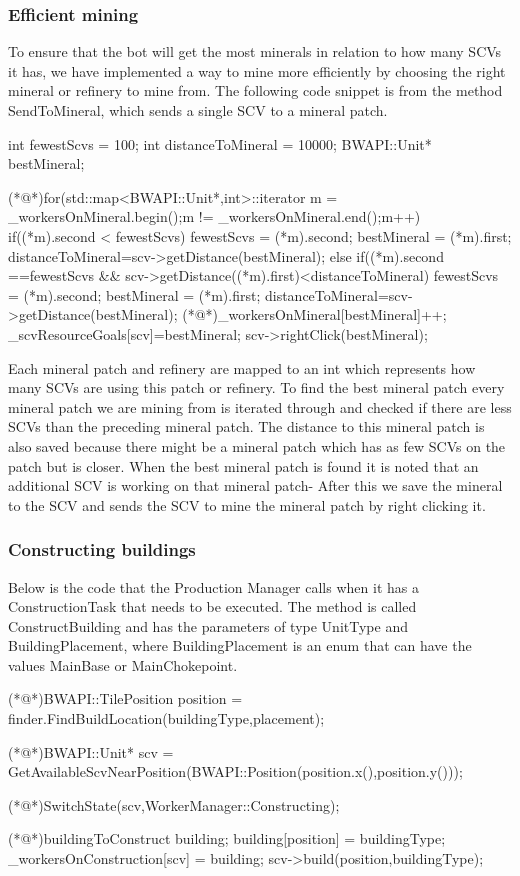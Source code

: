 		\subsubsection*{Efficient mining}
			To ensure that the bot will get the most minerals in relation to how many SCVs it has, we have implemented a way to mine more efficiently by choosing the right mineral or refinery to mine from. The following code snippet is from the method SendToMineral, which sends a single SCV
			to a mineral patch.
			
				\begin{Sourcecode}[caption=SendToMineral method]
	int fewestScvs = 100;
	int distanceToMineral = 10000;
	BWAPI::Unit* bestMineral;

	(*@\lnote@*)for(std::map<BWAPI::Unit*,int>::iterator m = _workersOnMineral.begin();m != _workersOnMineral.end();m++)
	{
		if((*m).second < fewestScvs)
		{
			fewestScvs = (*m).second;
			bestMineral = (*m).first;
			distanceToMineral=scv->getDistance(bestMineral);
		}
		else if((*m).second ==fewestScvs && scv->getDistance((*m).first)<distanceToMineral)
		{
			fewestScvs = (*m).second;
			bestMineral = (*m).first;
			distanceToMineral=scv->getDistance(bestMineral);
		}
	}
	(*@\lnote@*)_workersOnMineral[bestMineral]++;
	_scvResourceGoals[scv]=bestMineral;
	scv->rightClick(bestMineral);
				\end{Sourcecode}
			Each mineral patch and refinery are mapped to an int which represents how many SCVs are using this patch or refinery. To find the best mineral 
			patch every mineral patch we are mining from is iterated through  and checked if there are less SCVs than the preceding mineral patch. 
			The distance to this mineral patch is also saved because there might be a mineral patch which has as few SCVs on the patch but is closer. 
			When the best mineral patch is found it is noted that an additional SCV is working on that mineral patch- After this we save the 
			mineral to the SCV and sends the SCV to mine the mineral patch by right clicking it.
			
		\subsubsection*{Constructing buildings}
			Below is the code that the Production Manager calls when it has a ConstructionTask that needs to be executed. The method is called 
			ConstructBuilding and has the parameters of type UnitType and BuildingPlacement, where BuildingPlacement 
			is an enum that can have the values MainBase or MainChokepoint.
			\pagebreak
			\begin{Sourcecode}[caption=ConstructBuilding method]		
	(*@\lnote@*)BWAPI::TilePosition position = finder.FindBuildLocation(buildingType,placement);

	(*@\lnote@*)BWAPI::Unit* scv = GetAvailableScvNearPosition(BWAPI::Position(position.x(),position.y()));
	

	(*@\lnote@*)SwitchState(scv,WorkerManager::Constructing);
	
	(*@\lnote@*)buildingToConstruct building;	
	building[position] = buildingType;
	_workersOnConstruction[scv] = building;
	scv->build(position,buildingType);
			\end{Sourcecode}
			
